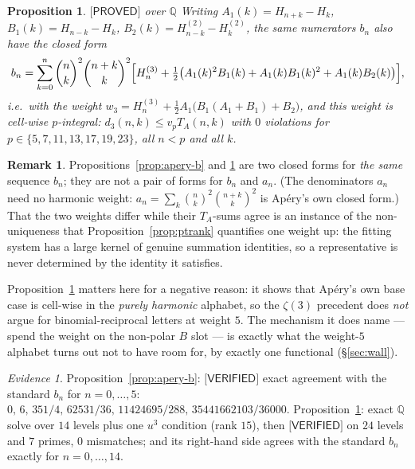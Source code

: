 \documentclass[11pt,reqno]{amsart}
\theoremstyle{plain}
\newtheorem{proposition}[theorem]{Proposition}
\theoremstyle{definition}
\newtheorem{remark}[theorem]{Remark}
\theoremstyle{remark}
\newtheorem{evidence}[theorem]{Evidence}
\numberwithin{equation}{section}
\newcommand{\QQ}{\mathbb{Q}}
\newcommand{\PROVED}{\textsf{[PROVED]}}
\newcommand{\VERIFIED}{\textsf{[VERIFIED]}}
\begin{document}
\begin{proposition}\label{prop:apery-a}
$\PROVED$ over $\QQ$ Writing $A_1(k)=H_{n+k}-H_k$, $B_1(k)=H_{n-k}-H_k$,
$B_2(k)=H^{(2)}_{n-k}-H^{(2)}_k$, the same numerators $b_n$ also have the closed form
\[
b_n=\sum_{k=0}^{n}\binom nk^2\binom{n+k}{k}^2\Bigl[H^{(3)}_n
+\tfrac12\bigl(A_1(k)^2B_1(k)+A_1(k)B_1(k)^2+A_1(k)B_2(k)\bigr)\Bigr],
\]
i.e.\ with the weight $w_3=H^{(3)}_n+\tfrac12A_1\bigl(B_1(A_1+B_1)+B_2\bigr)$, and this weight
is \emph{cell-wise $p$-integral}: $d_3(n,k)\le v_pT_A(n,k)$ with $0$ violations for
$p\in\{5,7,11,13,17,19,23\}$, all $n<p$ and all $k$.
\end{proposition}

\begin{remark}
Propositions~\ref{prop:apery-b} and \ref{prop:apery-a} are two closed forms for \emph{the same}
sequence $b_n$; they are not a pair of forms for $b_n$ and $a_n$. (The denominators $a_n$ need
no harmonic weight: $a_n=\sum_k\binom nk^2\binom{n+k}{k}^2$ is Ap\'ery's own closed form.) That
the two weights differ while their $T_A$-sums agree is an instance of the non-uniqueness that
Proposition~\ref{prop:ptrank} quantifies one weight up: the fitting system has a large kernel of
genuine summation identities, so a representative is never determined by the identity it
satisfies.
\end{remark}

Proposition~\ref{prop:apery-a} matters here for a negative reason: it shows that Ap\'ery's own
base case is cell-wise in the \emph{purely harmonic} alphabet, so the $\zeta(3)$ precedent does
\emph{not} argue for binomial-reciprocal letters at weight $5$. The mechanism it does name ---
spend the weight on the non-polar $B$ slot --- is exactly what the weight-$5$ alphabet turns
out not to have room for, by exactly one functional (\S\ref{sec:wall}).

\begin{evidence}\label{ev:apery}
Proposition~\ref{prop:apery-b}: $\VERIFIED$ exact agreement with the standard $b_n$ for
$n=0,\dots,5$: $0,\,6,\,351/4,\,62531/36,\,11424695/288,\,35441662103/36000$.
Proposition~\ref{prop:apery-a}: exact $\QQ$ solve over $14$ levels plus one $u^3$ condition
(rank $15$), then $\VERIFIED$ on $24$ levels and $7$ primes, $0$ mismatches; and its right-hand
side agrees with the standard $b_n$ exactly for $n=0,\dots,14$.
\end{evidence}
\end{document}
